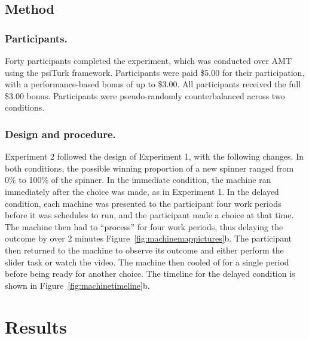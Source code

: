 \documentclass[10pt,letterpaper]{article}
\begin{document}
\subsection{Method}

\subsubsection{Participants.}

Forty participants completed the experiment, which was conducted over
AMT using the psiTurk framework.
Participants were paid \$5.00 for their participation, with a performance-based
bonus of up to \$3.00. All participants received the full \$3.00 bonus.
Participants were pseudo-randomly counterbalanced across two conditions.

\subsubsection{Design and procedure.}

Experiment 2 followed the design of Experiment 1, with the following changes. In
both conditions, the possible winning proportion of a new spinner ranged from 0\% to 100\% of
the spinner. In the immediate condition, the machine ran immediately after the
choice was made, as in Experiment 1. In the delayed condition, each machine was
presented to the participant four work periods before it was schedules to run,
and the participant made a choice at that time. The machine then had to
``process'' for four work periods, thus delaying
the outcome by over 2 minutes Figure~\ref{fig:machinemappictures}b. The participant then returned to the
machine to observe its outcome and either perform the slider task or
watch the video. The machine then cooled of for a single period before being
ready for another choice. The timeline for the delayed condition is shown in
Figure~\ref{fig:machinetimeline}b.

\section{Results}
\end{document}
